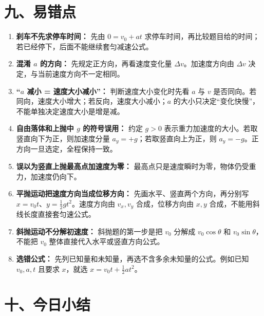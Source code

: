 \section*{九、易错点}

\begin{mistakebox}
\begin{enumerate}
  \item \textbf{刹车不先求停车时间：} 先由 $0=v_0+at$ 求停车时间，再比较题目给的时间；若已经停下，后面不能继续套匀减速公式。

  \item \textbf{混淆 $a$ 的方向：} 先规定正方向，再看速度变化量 $\Delta v$。加速度方向由 $\Delta v$ 决定，与当前速度方向不一定相同。

  \item \textbf{“$a$ 减小 = 速度大小减小”：} 判断速度大小变化时先看 $a$ 与 $v$ 是否同向。若同向，速度大小增大；若反向，速度大小减小；$a$ 的大小只决定“变化快慢”，不能单独决定速度大小是增是减。

  \item \textbf{自由落体和上抛中 $g$ 的符号误用：} 约定 $g>0$ 表示重力加速度的大小。若取竖直向下为正，则加速度分量 $a_y=+g$；若取竖直向上为正，则 $a_y=-g$。正方向一旦选定，全程保持一致。

  \item \textbf{误以为竖直上抛最高点加速度为零：} 最高点只是速度瞬时为零，物体仍受重力，加速度仍向下。

  \item \textbf{平抛运动把速度方向当成位移方向：} 先画水平、竖直两个方向，再分别写 $x=v_0t$、$y=\frac12gt^2$。速度方向由 $v_x,v_y$ 合成，位移方向由 $x,y$ 合成，不能用斜线长度直接套匀速公式。

  \item \textbf{斜抛运动不分解初速度：} 斜抛题的第一步是把 $v_0$ 分解成 $v_0\cos\theta$ 和 $v_0\sin\theta$，不能把 $v_0$ 整体直接代入水平或竖直方向公式。

  \item \textbf{选错公式：} 先列已知量和未知量，再选不含多余未知量的公式。例如已知 $v_0, a, t$ 且要求 $x$，就选 $x = v_0 t + \frac12 at^2$。
\end{enumerate}
\end{mistakebox}

\pagebreak[3]
\section*{十、今日小结}

